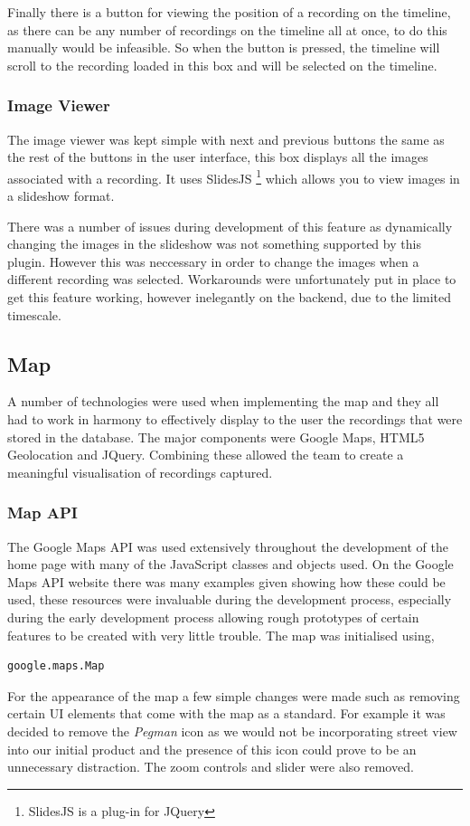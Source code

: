 \documentclass{l3proj}
\begin{document}
Finally there is a button for viewing the position of a recording on the timeline, as there can be any number of recordings on the timeline all at once, to do this manually would be infeasible. So when the button is pressed, the timeline will scroll to the recording loaded in this box and will be selected on the timeline.

\subsubsection{Image Viewer}		The image viewer was kept simple with next and previous buttons the same as the rest of the buttons in the user interface, this box displays all the images associated with a recording. It uses SlidesJS\cite{slidesJS} \footnote{SlidesJS is a plug-in for JQuery} which  allows you to view images in a slideshow format.

There was a number of issues during development of this feature as dynamically changing the images in the slideshow was not something supported by this plugin. However this was neccessary in order to change the images when a different recording was selected. Workarounds were unfortunately put in place to get this feature working, however inelegantly on the backend, due to the limited timescale.

\subsection{Map}		A number of technologies were used when implementing the map and they all had to work in harmony to effectively display to the user the recordings that were stored in the database. The major components were Google Maps, HTML5 Geolocation and \gls{JQuery}. Combining these allowed the team to create a meaningful visualisation of recordings captured.

\subsubsection{Map API}		The Google Maps \gls{API} was used extensively throughout the development of the home page with many of the \gls{JavaScript} classes and objects used. On the Google Maps API website there was many examples given showing how these could be used, these resources were invaluable during the development process, especially during the early development process allowing rough prototypes of certain features to be created with very little trouble. The map was initialised using,
\begin{verbatim}
google.maps.Map
\end{verbatim}
For the appearance of the map a few simple changes were made such as removing certain UI elements that come with the map as a standard. For example it was decided to remove the \textit{Pegman} icon as we would not be incorporating street view into our initial product and the presence of this icon could prove to be an unnecessary distraction. The zoom controls and slider were also removed.
\end{document}
